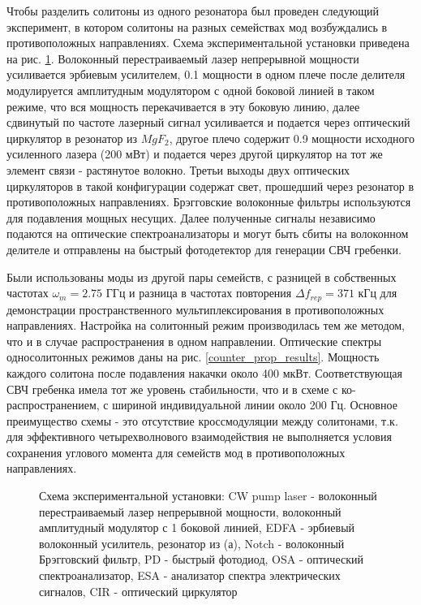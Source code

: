 Чтобы разделить солитоны из одного резонатора был проведен следующий эксперимент, в котором солитоны на разных семействах мод возбуждались в противоположных направлениях. Схема экспериментальной установки приведена на рис. \ref{Setup_CounterProp}. Волоконный перестраиваемый лазер непрерывной мощности усиливается эрбиевым усилителем, 0.1 мощности в одном плече после делителя модулируется амплитудным модулятором с одной боковой линией в таком режиме, что вся мощность перекачивается в эту боковую линию, далее сдвинутый по частоте лазерный сигнал усиливается и подается через оптический циркулятор в резонатор из $MgF_2$, другое плечо содержит 0.9 мощности исходного усиленного лазера (200 мВт) и подается через другой циркулятор на тот же элемент связи - растянутое волокно. Третьи выходы двух оптических циркуляторов в такой конфигурации содержат свет, прошедший через резонатор в противоположных направлениях. Брэгговские волоконные фильтры используются для подавления мощных несущих. Далее полученные сигналы независимо подаются на оптические спектроанализаторы и могут быть сбиты на волоконном делителе и отправлены на быстрый фотодетектор для генерации СВЧ гребенки.

Были использованы моды из другой пары семейств, с разницей в собственных частотах $\omega_m=2.75$ ГГц и разница в частотах повторения $\Delta f_{rep}=371$ кГц для демонстрации пространственного мультиплексирования в противоположных направлениях. Настройка на солитонный режим производилась тем же методом, что и в случае распространения в одном направлении. Оптические спектры односолитонных режимов даны на рис. \ref{counter_prop_results}. Мощность каждого солитона после подавления накачки около 400 мкВт. Соответствующая СВЧ гребенка имела тот же уровень стабильности, что и в схеме с ко-распространением, с шириной индивидуальной линии около 200 Гц. Основное преимущество схемы - это отсутствие кроссмодуляции между солитонами, т.к. для эффективного четырехволнового взаимодействия не выполняется условия сохранения углового момента для семейств мод в противоположных направлениях.

\begin{figure}[ht]
\begin{minipage}[ht]{1\linewidth}
\end{minipage}
\caption{Схема экспериментальной установки: CW pump laser - волоконный перестраиваемый лазер непрерывной мощности, волоконный амплитудный модулятор с 1 боковой линией, EDFA - эрбиевый волоконный усилитель, резонатор из (а), Notch - волоконный Брэгговский фильтр, PD - быстрый фотодиод, OSA - оптический спектроанализатор, ESA - анализатор спектра электрических сигналов, CIR - оптический циркулятор}
\label{Setup_CounterProp}
\end{figure}


